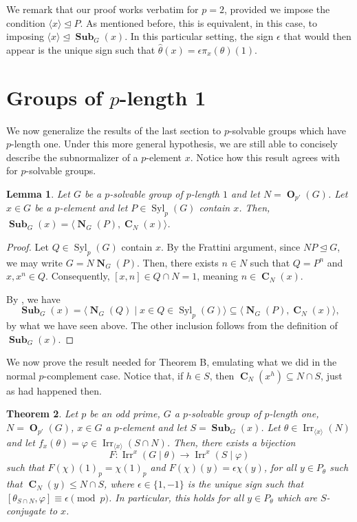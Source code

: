 \documentclass[12pt]{amsart}
\DeclareMathOperator{\CB}{\mathbf{C}}
\DeclareMathOperator{\OB}{\mathbf{O}}
\DeclareMathOperator{\NB}{\mathbf{N}}
\DeclareMathOperator{\Syl}{Syl}
\DeclareMathOperator{\Sub}{\mathbf{Sub}}
\DeclareMathOperator{\Irr}{Irr}
\theoremstyle{remark}
\theoremstyle{definition}
\theoremstyle{plain}
\newtheorem{thm}{Theorem}[section]
\newtheorem{lem}[thm]{Lemma}
\theoremstyle{definition}
\numberwithin{equation}{section}
\begin{document}
We remark that our proof works verbatim for $p = 2$, provided we impose the condition $\langle x \rangle \unlhd P$. As mentioned before, this is equivalent, in this case, to imposing $\langle x \rangle \unlhd \Sub_G(x)$. In this particular setting, the sign $\epsilon$ that would then appear is the unique sign such that $\widehat{\theta}(x) = \epsilon \pi_x(\theta)(1)$.

\section{Groups of $p$-length 1}
\label{Section 4}

We now generalize the results of the last section to $p$-solvable groups which have $p$-length one. Under this more general hypothesis, we are still able to concisely describe the subnormalizer of a $p$-element $x$. Notice how this result agrees with \cite[Proposition 2.12]{GunterSubnormalizer} for $p$-solvable groups.

\begin{lem}
	Let $G$ be a $p$-solvable group of $p$-length $1$ and let $N = \OB_{p'}(G)$. Let $x \in G$ be a $p$-element and let $P \in \Syl_p(G)$ contain $x$. Then, $\Sub_G(x) = \langle \NB_G(P), \CB_N(x) \rangle$.
\end{lem}

\begin{proof}
	Let $Q \in \Syl_p(G)$ contain $x$. By the Frattini argument, since $NP \unlhd G$, we may write $G = N \NB_G(P)$. Then, there exists $n \in N$ such that $Q = P^n$ and $x, x^n \in Q$. Consequently, $[x, n] \in Q \cap N = 1$, meaning $n \in \CB_N(x)$.
	
	By \cite[Proposition 2.6]{GunterSubnormalizer}, we have $$\Sub_G(x) = \langle \NB_G(Q) \mid x \in Q \in \Syl_p(G) \rangle \subseteq \langle \NB_G(P), \CB_N(x) \rangle,$$ by what we have seen above. The other inclusion follows from the definition of $\Sub_G(x)$.
\end{proof}

We now prove the result needed for Theorem B, emulating what we did in the normal $p$-complement case. Notice that, if $h \in S$, then $\CB_N(x^h) \subseteq N \cap S$, just as had happened then.

\begin{thm}
	\label{ThmBKey}
	Let $p$ be an odd prime, $G$ a $p$-solvable group of $p$-length one, $N = \OB_{p'}(G)$, $x \in G$ a $p$-element and let $S = \Sub_G(x)$. Let $\theta \in \Irr_{\langle x \rangle}(N)$ and let $f_x(\theta) = \varphi \in \Irr_{\langle x \rangle}(S \cap N)$. Then, there exists a bijection $$F: \Irr^x(G \mid \theta) \to \Irr^x(S \mid \varphi)$$ such that $F(\chi)(1)_p = \chi(1)_p$ and $F(\chi)(y) = \epsilon \chi(y)$, for all $y \in P_\theta$ such that $\CB_N(y) \leq N \cap S$, where $\epsilon \in \{1, -1\}$ is the unique sign such that $[\theta_{S \cap N}, \varphi] \equiv \epsilon \pmod{p}$. In particular, this holds for all $y \in P_\theta$ which are $S$-conjugate to $x$.
\end{thm}
\end{document}
